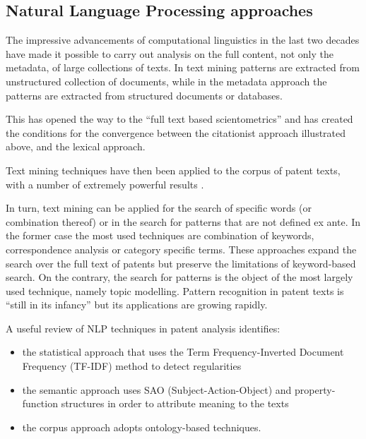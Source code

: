 \documentclass[]{book}
\providecommand{\tightlist}{%
  \setlength{\itemsep}{0pt}\setlength{\parskip}{0pt}}
\theoremstyle{definition}
\theoremstyle{definition}
\theoremstyle{definition}
\theoremstyle{remark}
\begin{document}
\subsection{Natural Language Processing
approaches}\label{natural-language-processing-approaches}

The impressive advancements of computational linguistics in the last two
decades have made it possible to carry out analysis on the full content,
not only the metadata, of large collections of texts. In text mining
patterns are extracted from unstructured collection of documents, while
in the metadata approach the patterns are extracted from structured
documents or databases.

This has opened the way to the ``full text based scientometrics''
\citep{boyack2013improving} and has created the conditions for the
convergence between the citationist approach illustrated above, and the
lexical approach.

Text mining techniques have then been applied to the corpus of patent
texts, with a number of extremely powerful results
\citep{tseng2007text, joung2017monitoring, kreuchauff2017patent, ozcan2017patent, yoon2012detecting}.

In turn, text mining can be applied for the search of specific words (or
combination thereof) or in the search for patterns that are not defined
ex ante. In the former case the most used techniques are combination of
keywords, correspondence analysis or category specific terms. These
approaches expand the search over the full text of patents but preserve
the limitations of keyword-based search. On the contrary, the search for
patterns is the object of the most largely used technique, namely topic
modelling. Pattern recognition in patent texts is ``still in its
infancy'' \citep{madani2016evolution} but its applications are growing
rapidly.

A useful review of NLP techniques in patent analysis
\citep{madani2016evolution} identifies:

\begin{itemize}
\tightlist
\item
  the statistical approach that uses the Term Frequency-Inverted
  Document Frequency (TF-IDF) method to detect regularities
\item
  the semantic approach uses SAO (Subject-Action-Object) and
  property-function structures in order to attribute meaning to the
  texts
\item
  the corpus approach adopts ontology-based techniques.
\end{itemize}
\end{document}
